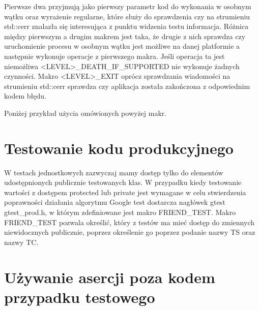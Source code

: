 \documentclass[12pt,a4paper,notitlepage]{report}
\begin{document}
Pierwsze dwa przyjmują jako pierwszy parametr kod do wykonania w osobnym wątku oraz wyrażenie regularne, które służy do sprawdzenia czy na strumieniu std::cerr znalazła się interesująca z punktu widzenia testu informacja. Różnica między pierwszym a drugim makrem jest taka, że drugie z nich sprawdza czy uruchomienie procesu w osobnym wątku jest możliwe na danej platformie a następnie wykonuje operacje z pierwszego makra. Jeśli operacja ta jest niemożliwa <LEVEL>{\_}DEATH{\_}IF{\_}SUPPORTED nie wykonuje żadnych czynności.
Makro <LEVEL>{\_}EXIT oprócz sprawdzania wiadomości na strumieniu std::cerr sprawdza czy aplikacja została zakończona z odpowiednim kodem błędu.

Poniżej przykład użycia omówionych powyżej makr.

			

\section{Testowanie kodu produkcyjnego}

W testach jednostkowych zazwyczaj mamy dostęp tylko do elementów udostępnionych publicznie testowanych klas. W przypadku kiedy testowanie wartości z dostępem protected lub private jest wymagane w celu stwierdzenia poprawności działania algorytmu Google test dostarcza nagłówek gtest\\gtest{\_}prod.h, w którym zdefiniowane jest makro FRIEND{\_}TEST.
Makro FRIEND{\_}TEST pozwala określić, który z testów ma mieć dostęp do zmiennych niewidocznych publicznie, poprzez określenie go poprzez podanie nazwy TS oraz nazwy TC.

			

\section{Używanie asercji poza kodem przypadku testowego}
\end{document}
